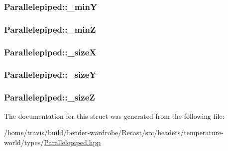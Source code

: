 \hypertarget{struct_parallelepiped_a5771e43afdf839db265e15405cb2cf06}{
\subsubsection[{\-\_\-min\-Y}]{ Parallelepiped\-::\-\_\-min\-Y\hspace{0.3cm}{\ttfamily [protected]}}}\label{struct_parallelepiped_a5771e43afdf839db265e15405cb2cf06}
\hypertarget{struct_parallelepiped_a236bbf5d0a7354f2f8c11566a9552631}{
\subsubsection[{\-\_\-min\-Z}]{ Parallelepiped\-::\-\_\-min\-Z\hspace{0.3cm}{\ttfamily [protected]}}}\label{struct_parallelepiped_a236bbf5d0a7354f2f8c11566a9552631}
\hypertarget{struct_parallelepiped_abff135261e4f3e6e8ea9c6dd185de0cd}{
\subsubsection[{\-\_\-size\-X}]{ Parallelepiped\-::\-\_\-size\-X\hspace{0.3cm}{\ttfamily [protected]}}}\label{struct_parallelepiped_abff135261e4f3e6e8ea9c6dd185de0cd}
\hypertarget{struct_parallelepiped_a722af4ec16bb4ede57cb73a527d16dbf}{
\subsubsection[{\-\_\-size\-Y}]{ Parallelepiped\-::\-\_\-size\-Y\hspace{0.3cm}{\ttfamily [protected]}}}\label{struct_parallelepiped_a722af4ec16bb4ede57cb73a527d16dbf}
\hypertarget{struct_parallelepiped_a99b032966bf653c13ca8d9645ad14b5e}{
\subsubsection[{\-\_\-size\-Z}]{ Parallelepiped\-::\-\_\-size\-Z\hspace{0.3cm}{\ttfamily [protected]}}}\label{struct_parallelepiped_a99b032966bf653c13ca8d9645ad14b5e}


The documentation for this struct was generated from the following file\-:\begin{DoxyCompactItemize}
\item 
/home/travis/build/bender-\/wardrobe/\-Recast/src/headers/temperature-\/world/types/\hyperlink{_parallelepiped_8hpp}{Parallelepiped.\-hpp}\end{DoxyCompactItemize}

